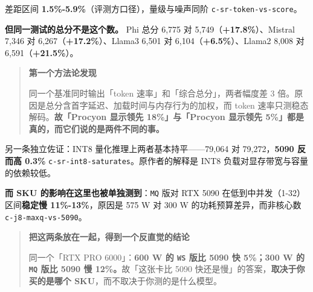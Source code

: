 差距区间 \textbf{1.5\%-\hspace{0pt}5.9\%}（评测方口径），量级与噪声同阶 {\scriptsize\texttt{c-\hspace{0pt}sr-\hspace{0pt}token-\hspace{0pt}vs-\hspace{0pt}score}}。


\textbf{但同一测试的总分不是这个数。} Phi 总分 6,775 对 5,749（\textbf{+17.8\%}）、Mistral 7,346 对 6,267（\textbf{+17.2\%}）、Llama3 6,501 对 6,104（\textbf{+6.5\%}）、Llama2 8,008 对 6,591（\textbf{+21.5\%}）。


\begin{quote}\small
\textbf{ 第一个方法论发现}

同一个基准同时输出「token 速率」和「综合总分」，两者幅度差 3 倍。原因是总分含首字延迟、加载时间与内存行为的加权，而 token 速率只测稳态解码。\textbf{故「Procyon 显示领先 18\%」与「Procyon 显示领先 5\%」都是真的，而它们说的是两件不同的事。}

\end{quote}

另一条独立佐证：INT8 量化推理上两者基本持平——79,064 对 79,272，\textbf{5090 反而高 0.3\%} {\scriptsize\texttt{c-\hspace{0pt}sr-\hspace{0pt}int8-\hspace{0pt}saturates}}。原作者的解释是 INT8 负载对显存带宽与容量的依赖较低。


\textbf{而 SKU 的影响在这里也被单独测到}：\texttt{MQ} 版对 RTX 5090 在低到中并发（1-\hspace{0pt}32）区间\textbf{稳定慢 11\%-\hspace{0pt}13\%}，原因是 575 W 对 300 W 的功耗预算差异，而非核心数 {\scriptsize\texttt{c-\hspace{0pt}j8-\hspace{0pt}maxq-\hspace{0pt}vs-\hspace{0pt}5090}}。


\begin{quote}\small
\textbf{ 把这两条放在一起，得到一个反直觉的结论}

同一个「RTX PRO 6000」：\textbf{600 W 的 \texttt{WS} 版比 5090 快 5\%；300 W 的 \texttt{MQ} 版比 5090 慢 12\%。}故「这张卡比 5090 快还是慢」的答案，\textbf{取决于你买的是哪个 SKU}，而不取决于你测的是什么模型。

\end{quote}


